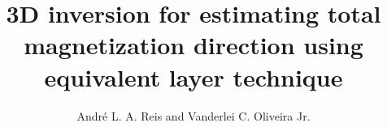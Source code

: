 \documentclass[manuscript,revised]{geophysics}
\begin{document}
\title{3D inversion for estimating total magnetization direction using equivalent layer technique}

\renewcommand{\thefootnote}{\fnsymbol{footnote}} 


\address{
\footnotemark[1] Observat\'orio Nacional, Rio de Janeiro, Brazil\\
e-mails: decoluisreis@gmail.com, vanderlei@on.br}
\author{Andr\'e L. A. Reis \footnotemark[1] and Vanderlei C. Oliveira Jr.\footnotemark[1]}


\maketitle



%

\end{document}
